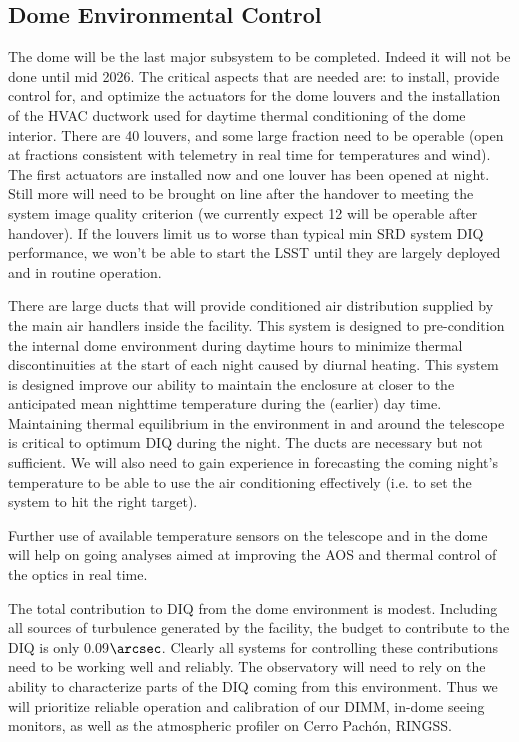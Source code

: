 \subsection{Dome Environmental Control}
The dome will be the last major subsystem to be completed. Indeed it will not be done until mid 2026. The critical aspects that are needed are: to install, provide control for, and optimize the actuators for the dome louvers and the installation of the HVAC ductwork used for daytime thermal conditioning of the dome interior. There are 40 louvers, and some large fraction need to be operable (open at fractions consistent with telemetry in real time for temperatures and wind). The first actuators are installed now and one louver has been opened at night. Still more will need to be brought on line after the handover to meeting the system image quality criterion (we currently expect 12 will be operable after handover). If the louvers limit us to worse than typical min SRD system DIQ performance, we won't be able to start the LSST until they are largely deployed and in routine operation. 

There are large ducts that will provide conditioned air distribution supplied by the main air handlers inside the facility. This system is designed to pre-condition the internal dome environment during daytime hours to minimize thermal discontinuities at the start of each night caused by diurnal heating.  This system is designed improve our ability to maintain the enclosure at closer to the anticipated mean nighttime temperature during the (earlier) day time. Maintaining thermal equilibrium in the environment in and around the telescope is critical to optimum DIQ during the night. The ducts are necessary but not sufficient. We will also need to gain experience in forecasting the coming night's temperature to be able to use the air conditioning effectively (i.e. to set the system to hit the right target). 

Further use of available temperature sensors on the telescope and in the dome will help on going analyses aimed at improving the AOS and thermal control of the optics in real time. 

The total contribution to DIQ from the dome environment is modest. Including all sources of turbulence generated by the facility, the budget to contribute to the DIQ is only 0.09$\arcsec$. Clearly all systems for controlling these contributions need to be working well and reliably. The observatory will need to rely on the ability to characterize parts of the DIQ coming from this environment. Thus we will prioritize reliable operation and calibration of our DIMM, in-dome seeing monitors, as well as the atmospheric profiler on Cerro Pach\'{on}, RINGSS.  

